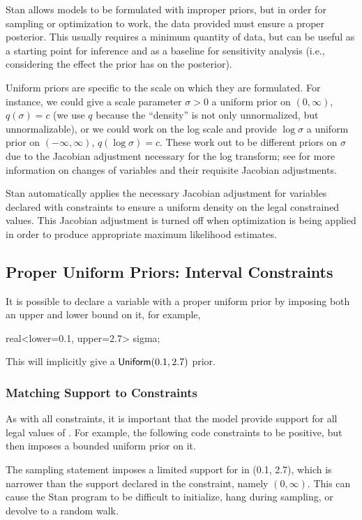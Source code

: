 Stan allows models to be formulated with improper priors, but in order
for sampling or optimization to work, the data provided must ensure a
proper posterior.  This usually requires a minimum quantity of data,
but can be useful as a starting point for inference and as a baseline
for sensitivity analysis (i.e., considering the effect the prior
has on the posterior).

Uniform priors are specific to the scale on which they are formulated.
For instance, we could give a scale parameter $\sigma > 0$ a uniform
prior on $(0,\infty)$, $q(\sigma) = c$ (we use $q$ because the
``density'' is not only unnormalized, but unnormalizable), or we could
work on the log scale and provide $\log \sigma$ a uniform prior on
$(-\infty,\infty)$, $q(\log \sigma) = c$.  These work out to be
different priors on $\sigma$ due to the Jacobian adjustment necessary
for the log transform; see  for more
information on changes of variables and their requisite Jacobian
adjustments.

Stan automatically applies the necessary Jacobian adjustment for
variables declared with constraints to ensure a uniform density on the
legal constrained values.  This Jacobian adjustment is turned off when
optimization is being applied in order to produce appropriate maximum
likelihood estimates.

\subsection{Proper Uniform Priors: Interval Constraints}

It is possible to declare a variable with a proper uniform prior by
imposing both an upper and lower bound on it, for example,
%
\begin{stancode}
real<lower=0.1, upper=2.7> sigma;
\end{stancode}
%
This will implicitly give  a $\mbox{\sf Uniform}(0.1, 2.7)$
prior.

\subsubsection{Matching Support to Constraints}

As with all constraints, it is important that the model
provide support for all legal values of .  For example,
the following code constraints  to be positive, but then
imposes a bounded uniform prior on it.
%
\begin{stancode}
parameters {
  real<lower=0> sigma;
  ...
model {
  // *** bad *** : support narrower than constraint
  sigma ~ uniform(0.1, 2.7);
\end{stancode}
%
The sampling statement imposes a limited support for  in
(0.1, 2.7), which is narrower than the support declared in the
constraint, namely $(0, \infty)$.  This can cause the Stan program to
be difficult to initialize, hang during sampling, or devolve to a
random walk.

